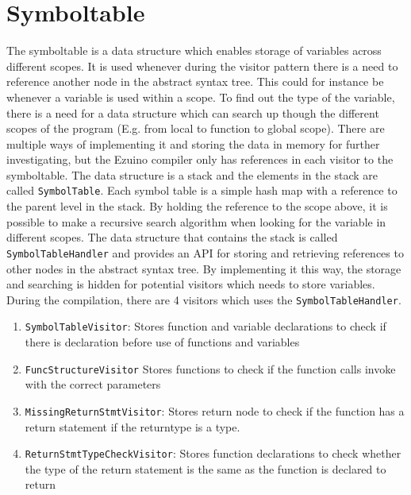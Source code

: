 \section{Symboltable}

The symboltable is a data structure which enables storage of variables across different scopes. It is used whenever during the visitor pattern there is a need to reference another node in the abstract syntax tree. This could for instance be whenever a variable is used within a scope. To find out the type of the variable, there is a need for a data structure which can search up though the different scopes of the program (E.g. from local to function to global scope).
There are multiple ways of implementing it and storing the data in memory for further investigating, but the Ezuino compiler only has references in each visitor to the symboltable.
The data structure is a stack and the elements in the stack are called \texttt{SymbolTable}. Each symbol table is a simple hash map with a reference to the parent level in the stack. By holding the reference to the scope above, it is possible to make a recursive search algorithm when looking for the variable in different scopes.
The data structure that contains the stack is called \texttt{SymbolTableHandler} and provides an API for storing and retrieving references to other nodes in the abstract syntax tree. By implementing it this way, the storage and searching is hidden for potential visitors which needs to store variables.
During the compilation, there are 4 visitors which uses the \texttt{SymbolTableHandler}.
\begin{enumerate}
    \item \texttt{SymbolTableVisitor}: Stores function and variable declarations to check if there is declaration before use of functions and variables
    \item \texttt{FuncStructureVisitor} Stores functions to check if the function calls invoke with the correct parameters
    \item \texttt{MissingReturnStmtVisitor}: Stores return node to check if the function has a return statement if the returntype is a type.
    \item \texttt{ReturnStmtTypeCheckVisitor}: Stores function declarations to check whether the type of the return statement is the same as the function is declared to return
\end{enumerate}